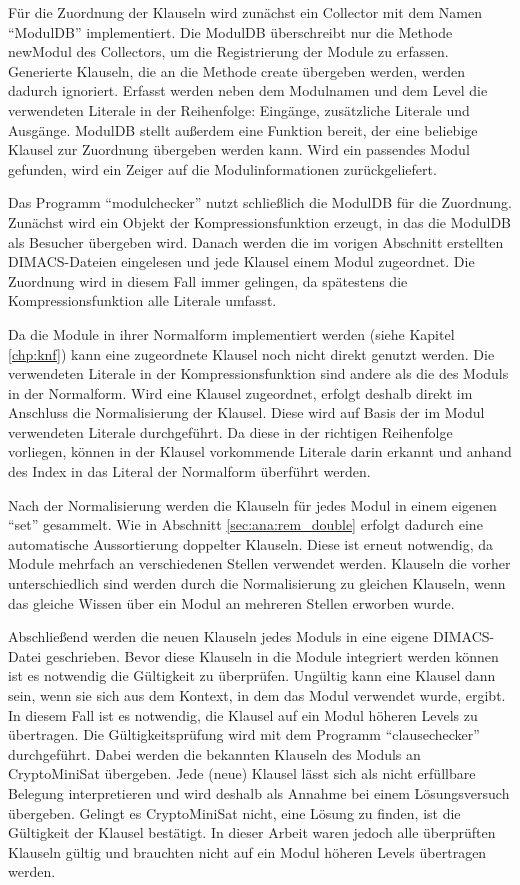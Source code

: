 Für die Zuordnung der Klauseln wird zunächst ein Collector mit dem Namen "`ModulDB"' implementiert. Die ModulDB überschreibt nur die Methode newModul des Collectors,
um die Registrierung der Module zu erfassen. Generierte Klauseln, die an die Methode create übergeben werden, werden dadurch ignoriert. Erfasst werden neben dem
Modulnamen und dem Level die verwendeten Literale in der Reihenfolge: Eingänge, zusätzliche Literale und Ausgänge. ModulDB stellt außerdem eine Funktion bereit,
der eine beliebige Klausel zur Zuordnung übergeben werden kann. Wird ein passendes Modul gefunden, wird ein Zeiger auf die Modulinformationen zurückgeliefert.

Das Programm "`modulchecker"' nutzt schließlich die ModulDB für die Zuordnung. Zunächst wird ein Objekt der Kompressionsfunktion erzeugt, in das die ModulDB als
Besucher übergeben wird. Danach werden die im vorigen Abschnitt erstellten DIMACS-Dateien eingelesen und jede Klausel einem Modul zugeordnet. Die Zuordnung wird
in diesem Fall immer gelingen, da spätestens die Kompressionsfunktion alle Literale umfasst.

Da die Module in ihrer Normalform implementiert werden (siehe Kapitel \ref{chp:knf}) kann eine zugeordnete Klausel noch nicht direkt genutzt werden.
Die verwendeten Literale in der Kompressionsfunktion sind andere als die des Moduls in der Normalform. Wird eine Klausel zugeordnet, erfolgt deshalb
direkt im Anschluss die Normalisierung der Klausel. Diese wird auf Basis der im Modul verwendeten Literale durchgeführt. Da diese in der richtigen
Reihenfolge vorliegen, können in der Klausel vorkommende Literale darin erkannt und anhand des Index in das Literal der Normalform überführt werden.

Nach der Normalisierung werden die Klauseln für jedes Modul in einem eigenen "`set"' gesammelt. Wie in Abschnitt \ref{sec:ana:rem_double} erfolgt
dadurch eine automatische Aussortierung doppelter Klauseln. Diese ist erneut notwendig, da Module mehrfach an verschiedenen Stellen verwendet werden.
Klauseln die vorher unterschiedlich sind werden durch die Normalisierung zu gleichen Klauseln, wenn das gleiche Wissen über ein Modul an mehreren
Stellen erworben wurde.

Abschließend werden die neuen Klauseln jedes Moduls in eine eigene DIMACS-Datei geschrieben. Bevor diese Klauseln in die Module integriert werden können ist
es notwendig die Gültigkeit zu überprüfen. Ungültig kann eine Klausel dann sein, wenn sie sich aus dem Kontext, in dem das Modul verwendet wurde, ergibt.
In diesem Fall ist es notwendig, die Klausel auf ein Modul höheren Levels zu übertragen. Die Gültigkeitsprüfung wird mit dem Programm "`clausechecker"'
durchgeführt. Dabei werden die bekannten Klauseln des Moduls an CryptoMiniSat übergeben. Jede (neue) Klausel lässt sich als nicht erfüllbare Belegung
interpretieren und wird deshalb als Annahme bei einem Lösungsversuch übergeben. Gelingt es CryptoMiniSat nicht, eine Lösung zu finden, ist die Gültigkeit
der Klausel bestätigt. In dieser Arbeit waren jedoch alle überprüften Klauseln gültig und brauchten nicht auf ein Modul höheren Levels übertragen werden.








